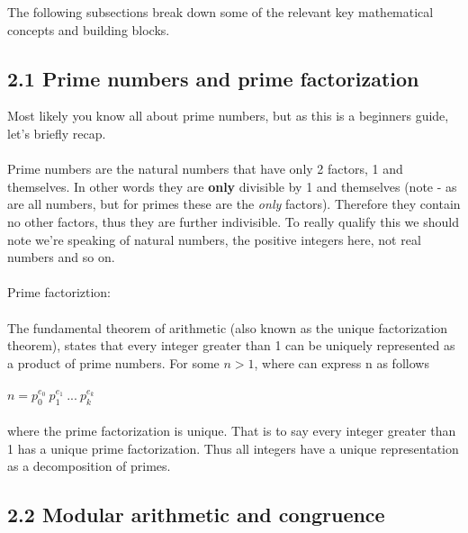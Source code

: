 \documentclass[11pt]{article}   	%
\begin{document}
The following subsections break down some of the relevant key mathematical concepts and building blocks.

\subsection*{2.1 Prime numbers and prime factorization}

Most likely you know all about prime numbers, but as this is a beginners guide, let's briefly recap. \\
\\
Prime numbers are the natural numbers that have only 2 factors, 1 and themselves. In other words they are \textbf{only} divisible by 1 and themselves (note - as are all numbers, but for primes these are the \textit{only} factors). Therefore they contain no other factors, thus they are further indivisible. To really qualify this we should note we're speaking of natural numbers, the positive integers here, not real numbers and so on. \\
\\
Prime factoriztion: \\
\\
The fundamental theorem of arithmetic (also known as the unique factorization theorem), states that every integer greater than 1 can be uniquely represented as a product of prime numbers. For some $ n > 1 $, where can express n as follows \\
\\
$ n = p_0^{e_0} \ p_1^{e_1} \ ... \ p_k^{e_k} $ \\
\\
where the prime factorization is unique. That is to say every integer greater than 1 has a unique prime factorization. Thus all integers have a unique representation as a decomposition of primes.


\subsection*{2.2 Modular arithmetic and congruence}
\end{document}
